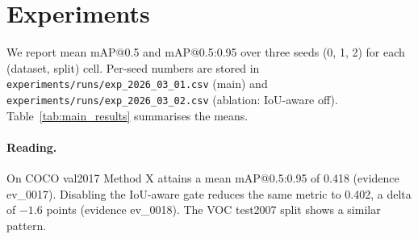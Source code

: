 \section{Experiments}
\label{sec:experiments}

We report mean mAP@0.5 and mAP@0.5:0.95 over three seeds (0, 1, 2) for
each (dataset, split) cell. Per-seed numbers are stored in
\texttt{experiments/runs/exp\_2026\_03\_01.csv} (main) and
\texttt{experiments/runs/exp\_2026\_03\_02.csv} (ablation: IoU-aware off).
Table~\ref{tab:main_results} summarises the means.



\paragraph{Reading.} On COCO val2017 Method X attains a mean
mAP@0.5:0.95 of 0.418 (evidence ev\_0017). Disabling the IoU-aware gate
reduces the same metric to 0.402, a delta of $-1.6$ points (evidence
ev\_0018). The VOC test2007 split shows a similar pattern.
